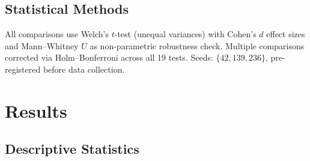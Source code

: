 \documentclass[11pt]{article}
\begin{document}
\subsection{Statistical Methods}

All comparisons use Welch's $t$-test (unequal variances) with Cohen's $d$ effect sizes and Mann--Whitney $U$ as non-parametric robustness check. Multiple comparisons corrected via Holm--Bonferroni across all 19 tests. Seeds: $\{42, 139, 236\}$, pre-registered before data collection.

\section{Results}

\subsection{Descriptive Statistics}
\end{document}

